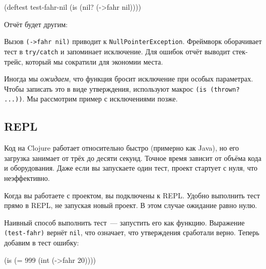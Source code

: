 \begin{english}
  \begin{clojure}
(deftest test-fahr-nil
  (is (nil? (->fahr nil))))
  \end{clojure}
\end{english}

\noindent
Отчёт будет другим:

\begin{english}
\end{english}


Вызов \verb|(->fahr nil)| приводит к \verb|NullPointerException|. Фреймворк
оборачивает тест в \verb|try/catch| и запоминает исключение. Для ошибок отчёт
выводит стек-трейс, который мы сократили для экономии места.

Иногда мы \emph{ожидаем}, что функция бросит исключение при особых
параметрах. Чтобы записать это в виде утверждения, используют макрос
\verb|(is (thrown? ...))|. Мы рассмотрим пример с исключениями позже.

\subsection{REPL}


Код на Clojure работает относительно быстро (примерно как Java), но его загрузка
занимает от трёх до десяти секунд. Точное время зависит от объёма кода и
оборудования. Даже если вы запускаете один тест, проект стартует с нуля, что
неэффективно.

Когда вы работаете с проектом, вы подключены к REPL. Удобно выполнить тест прямо
в REPL, не запуская новый проект. В этом случае ожидание равно нулю.

Наивный способ выполнить тест~--- запустить его как функцию. Выражение
\verb|(test-fahr)| вернёт \verb|nil|, что означает, что утверждения
сработали верно. Теперь добавим в тест ошибку:

\begin{english}
  \begin{clojure}
(is (= 999 (int (->fahr 20))))
  \end{clojure}
\end{english}

